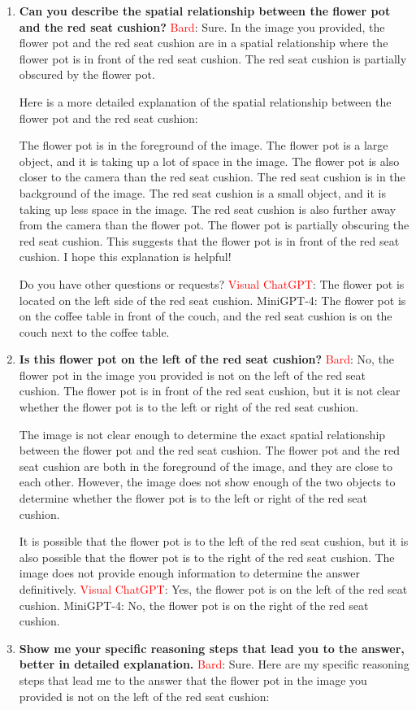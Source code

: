 \begin{enumerate}
    \item \textbf{Can you describe the spatial relationship between the flower pot and the red seat cushion?}
    \subitem \textcolor{Red}{Bard}: 
    Sure. In the image you provided, the flower pot and the red seat cushion are in a spatial relationship where the flower pot is in front of the red seat cushion. The red seat cushion is partially obscured by the flower pot.
    
    Here is a more detailed explanation of the spatial relationship between the flower pot and the red seat cushion:
    
    The flower pot is in the foreground of the image. The flower pot is a large object, and it is taking up a lot of space in the image. The flower pot is also closer to the camera than the red seat cushion.
    The red seat cushion is in the background of the image. The red seat cushion is a small object, and it is taking up less space in the image. The red seat cushion is also further away from the camera than the flower pot.
    The flower pot is partially obscuring the red seat cushion. This suggests that the flower pot is in front of the red seat cushion.
    I hope this explanation is helpful!
    
    Do you have other questions or requests?
    \subitem \textcolor{red}{Visual ChatGPT}: The flower pot is located on the left side of the red seat cushion.
    \subitem MiniGPT-4: The flower pot is on the coffee table in front of the couch, and the red seat cushion is on the couch next to the coffee table.
    \item \textbf{Is this flower pot on the left of the red seat cushion?}
    \subitem \textcolor{Red}{Bard}: 
    No, the flower pot in the image you provided is not on the left of the red seat cushion. The flower pot is in front of the red seat cushion, but it is not clear whether the flower pot is to the left or right of the red seat cushion.
    
    The image is not clear enough to determine the exact spatial relationship between the flower pot and the red seat cushion. The flower pot and the red seat cushion are both in the foreground of the image, and they are close to each other. However, the image does not show enough of the two objects to determine whether the flower pot is to the left or right of the red seat cushion.
    
    It is possible that the flower pot is to the left of the red seat cushion, but it is also possible that the flower pot is to the right of the red seat cushion. The image does not provide enough information to determine the answer definitively.
    \subitem \textcolor{red}{Visual ChatGPT}: Yes, the flower pot is on the left of the red seat cushion.
    \subitem MiniGPT-4: No, the flower pot is on the right of the red seat cushion.
    \item \textbf{Show me your specific reasoning steps that lead you to the answer, better in detailed explanation.}
    \subitem \textcolor{Red}{Bard}: Sure. Here are my specific reasoning steps that lead me to the answer that the flower pot in the image you provided is not on the left of the red seat cushion:


\end{enumerate}

